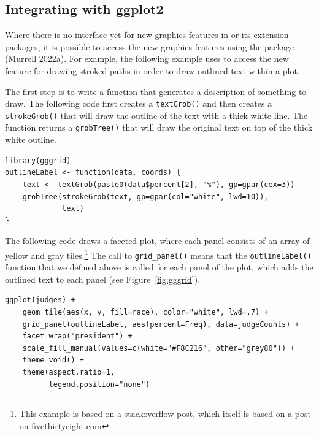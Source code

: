\hypertarget{integrating-with-ggplot2}{%
\subsection{Integrating with ggplot2}\label{integrating-with-ggplot2}}

Where there is no interface yet for new graphics features
in  or its extension packages,
it is possible to access the new graphics features using the
 package (Murrell 2022a).
For example, the following example uses  to access
the new feature for drawing stroked paths in order to draw outlined text
within a  plot.

The first step is to write a function that generates a description of
something to draw. The following code first creates a \texttt{textGrob()}
and then creates a \texttt{strokeGrob()} that will draw the outline of the text
with a thick white line.
The function returns a \texttt{grobTree()} that will draw the original
text on top of the thick white outline.

\begin{verbatim}
library(gggrid)
outlineLabel <- function(data, coords) {
    text <- textGrob(paste0(data$percent[2], "%"), gp=gpar(cex=3))
    grobTree(strokeGrob(text, gp=gpar(col="white", lwd=10)),
             text)
}
\end{verbatim}

The following code draws a faceted  plot, where each panel
consists of an array
of yellow and gray tiles.\footnote{This example is based on a
  \href{https://stackoverflow.com/questions/70529987/outlined-letters-in-text-ggplot2-538-style}{stackoverflow post}, which itself is based on a
  \href{https://fivethirtyeight.com/features/trump-made-the-federal-courts-whiter-and-more-conservative-and-that-will-be-tough-for-biden-to-reverse/}{post on fivethirtyeight.com}}
The call to \texttt{grid\_panel()} means that the \texttt{outlineLabel()}
function that we defined above
is called for each panel of the plot, which
adds the outlined text to each panel (see Figure~\ref{fig:gggrid}).

\begin{verbatim}
ggplot(judges) +
    geom_tile(aes(x, y, fill=race), color="white", lwd=.7) +
    grid_panel(outlineLabel, aes(percent=Freq), data=judgeCounts) +
    facet_wrap("president") +
    scale_fill_manual(values=c(white="#F8C216", other="grey80")) +
    theme_void() +
    theme(aspect.ratio=1,
          legend.position="none")
\end{verbatim}

